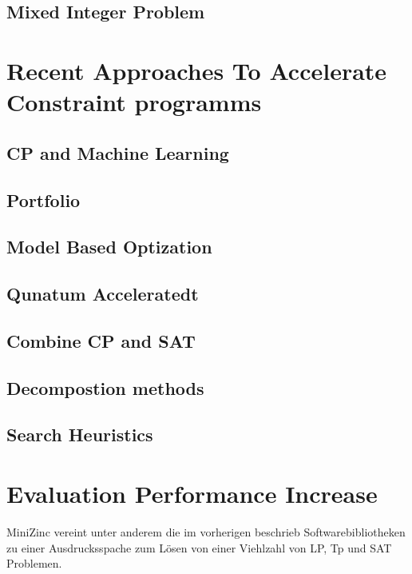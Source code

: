\subsection{Mixed Integer Problem}
\label{sec: Mixed Integer Problem}


\section{Recent Approaches To Accelerate Constraint programms}
\label{sec:Recent Approaches To Accelerate Constraint programms}


\subsection{CP and Machine Learning}
\label{sec:CP and Machine Learning}

  
\subsection{Portfolio}
\label{sec:Portfolio}

  
\subsection{Model Based Optization}
\label{sec:Model Based Optization}

  
\subsection{Qunatum Acceleratedt}
\label{sec:Qunatum Accelerated}

  
\subsection{Combine CP and SAT}
\label{sec:Combine CP and SAT}

  
\subsection{Decompostion methods}
\label{sec:Decompostion methods}

  
\subsection{Search Heuristics}
\label{sec:Search Heuristics}


\section{Evaluation Performance Increase}
\label{sec:Evaluation Performance Increase}

MiniZinc vereint unter anderem die im vorherigen beschrieb
Softwarebibliotheken zu einer Ausdrucksspache zum Lösen von einer Viehlzahl von 
LP, Tp und SAT Problemen. \cite{MiniZwe}




\printbibliography[heading=bibintoc]





